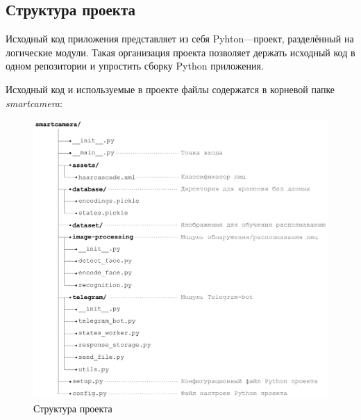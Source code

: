 \subsection{Структура проекта}

Исходный код приложения представляет из себя Pyhton—проект, разделённый на
логические модули. Такая организация проекта позволяет держать исходный код
в одном репозитории и упростить сборку Python приложения.

Исходный код и используемые в проекте файлы содержатся в корневой папке
\textit{smartcamera}:

\begin{figure}[h!]
  \centering
  \setlength{\fboxsep}{5pt}
  \includegraphics[width=1\textwidth]{data-visualisation/project-tree}
  \vspace*{6pt}
  \caption{Структура проекта}\label{fig:project-tree}
\end{figure}
